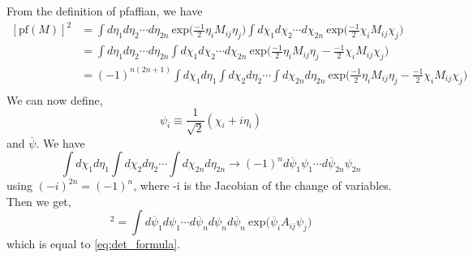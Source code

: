 From the definition of pfaffian, we have
\begin{align}
\label{pfaffian0}
[\text{pf}(M)]^{2}&=  
\int  d\eta_{1} d\eta_{2} \cdots d\eta_{2n} ~ \text{exp} \Big( \frac{-1}{2}\eta_{i} M_{ij} 
\eta_{j}\Big) \int  d\chi_{1} d\chi_{2} \cdots d\chi_{2n} ~ \text{exp} \Big( \frac{-1}{2}\chi_{i} M_{ij} \chi_{j}\Big)\\
                         &= \int  d\eta_{1} d\eta_{2} \cdots d\eta_{2n}  \int  d\chi_{1} d\chi_{2} 
                         \cdots d\chi_{2n} ~ \text{exp} \Big( \frac{-1}{2}\eta_{i} M_{ij} \eta_{j} -  \frac{-1}{2}\chi_{i} M_{ij} \chi_{j}\Big)\\
                         &=(-1)^{n(2n+1)} \int d\chi_{1} d\eta_{1}\int d\chi_{2} d\eta_{2} \cdots 
                         \int d\chi_{2n} d\eta_{2n} ~ \text{exp} \Big( \frac{-1}{2}\eta_{i} M_{ij} \eta_{j} -  \frac{-1}{2}\chi_{i} M_{ij} \chi_{j}\Big) \\
\end{align}
We can now define, 
\begin{equation}
\psi_{i} \equiv \frac{1}{\sqrt{2}} (\chi_{i} + i \eta_{i})
\end{equation}
and $\overline{\psi}$. We have 
\[ \int d\chi_{1} d\eta_{1}\int d\chi_{2} d\eta_{2} \cdots \int d\chi_{2n} d\eta_{2n}  \to (-1)^{n} d\overline{\psi}_{1}\psi_{1} \cdots d\overline{\psi}_{2n}\psi_{2n} \]
using $ (-i)^{2n} = (-1)^n$, where -i is the Jacobian of the change of variables. Then we get, 
\begin{equation}
[\text{pf}(M)]^{2} =  \int  d\overline{\psi}_{1} d\psi_{1} \cdots d\overline{\psi}_{n} d\psi_{n} d\overline{\psi}_{n} ~ \text{exp}  \Big( \overline{\psi}_{i} A_{ij} \psi_{j}\Big)
\end{equation}
which is equal to \ref{eq:det_formula}. 


















